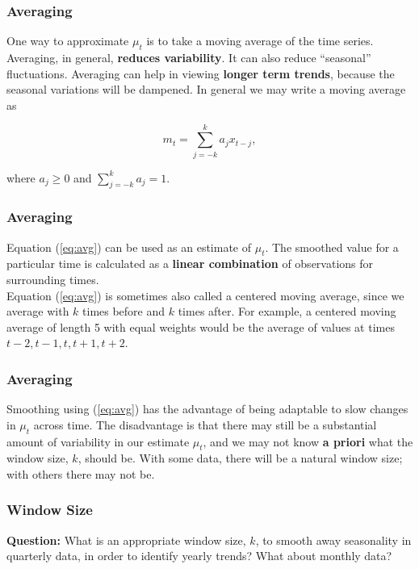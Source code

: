 \documentclass[%
xcolor=pdftex]{beamer}
\begin{document}
\begin{frame}
\frametitle{Averaging}

One way to approximate $\mu_t$ is to take a moving average of the time series.  Averaging, in general, \textbf{reduces variability}.  It can also reduce ``seasonal'' fluctuations. Averaging can help in viewing \textbf{longer term trends}, because the seasonal variations will be dampened.  In general we may write a moving average as

\begin{equation} \label{eq:avg}
m_t=\sum_{j=-k}^{k} a_j x_{t-j},
\end{equation}

where $a_j \geq 0$ and $\sum_{j=-k}^k a_j = 1$.

\end{frame}

\begin{frame}
\frametitle{Averaging}

Equation (\ref{eq:avg}) can be used as an estimate of $\mu_t$. The smoothed value for a particular time is calculated as a \textbf{linear combination} of observations for surrounding times. \\
\vspace{5mm}
Equation (\ref{eq:avg}) is sometimes also called a centered moving average, since we average with $k$ times before and $k$ times after. For example, a centered moving average of length 5 with equal weights would be the average of values at times $t-2, t-1, t, t+1, t+2$.

\end{frame}

\begin{frame}
\frametitle{Averaging}

Smoothing using (\ref{eq:avg}) has the advantage of being adaptable to slow changes in $\mu_t$ across time.  The disadvantage is that there may still be a substantial amount of variability in our estimate $\mu_t$, and we may not know {\bf a priori} what the window size, $k$, should be.  With some data, there will be a natural window size; with others there may not be.

\end{frame}

\begin{frame}
\frametitle{Window Size}

\textbf{Question:} What is an appropriate window size, $k$, to smooth away seasonality in quarterly data, in order to identify yearly trends? What about monthly data? 


\vspace{50mm}



\end{frame}
\end{document}
